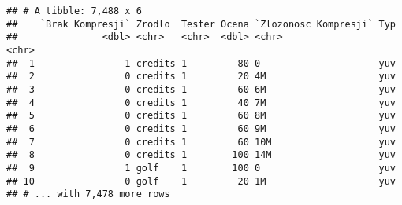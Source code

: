 \documentclass[]{article}
\begin{document}
\begin{verbatim}
## # A tibble: 7,488 x 6
##    `Brak Kompresji` Zrodlo  Tester Ocena `Zlozonosc Kompresji` Typ  
##               <dbl> <chr>   <chr>  <dbl> <chr>                 <chr>
##  1                1 credits 1         80 0                     yuv  
##  2                0 credits 1         20 4M                    yuv  
##  3                0 credits 1         60 6M                    yuv  
##  4                0 credits 1         40 7M                    yuv  
##  5                0 credits 1         60 8M                    yuv  
##  6                0 credits 1         60 9M                    yuv  
##  7                0 credits 1         60 10M                   yuv  
##  8                0 credits 1        100 14M                   yuv  
##  9                1 golf    1        100 0                     yuv  
## 10                0 golf    1         20 1M                    yuv  
## # ... with 7,478 more rows
\end{verbatim}
\end{document}
